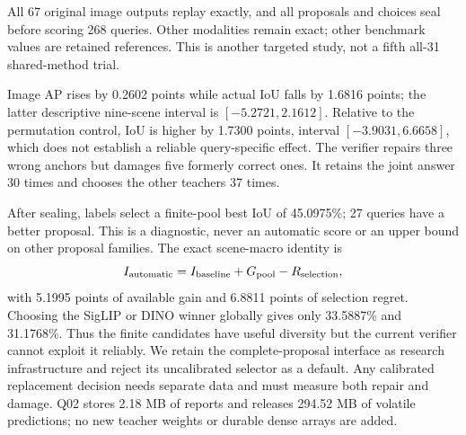 \documentclass[10pt]{article}
\begin{document}
All 67 original image outputs replay exactly, and all proposals and choices
seal before scoring 268 queries. Other modalities remain exact; other benchmark
values are retained references. This is another targeted study, not a fifth
all-31 shared-method trial.
\begin{table}[ht]
\centering\small

\caption{Q02: preserving complete proposals does not by itself guarantee a
correct identity-verification decision. Neither automatic rule is promoted.}
\end{table}

Image AP rises by 0.2602 points while actual IoU falls by 1.6816 points; the
latter descriptive nine-scene interval is $[-5.2721,2.1612]$. Relative to the
permutation control, IoU is higher by 1.7300 points, interval
$[-3.9031,6.6658]$, which does not establish a reliable query-specific effect.
The verifier repairs three wrong anchors but damages five formerly correct ones.
It retains the joint answer 30 times and chooses the other teachers 37 times.

After sealing, labels select a finite-pool best IoU of 45.0975\%; 27 queries
have a better proposal. This is a diagnostic, never an automatic score or an
upper bound on other proposal families. The exact scene-macro identity is
\begin{equation}
 I_{\rm automatic}=I_{\rm baseline}+G_{\rm pool}-R_{\rm selection},
\end{equation}
with 5.1995 points of available gain and 6.8811 points of selection regret.
Choosing the SigLIP or DINO winner globally gives only 33.5887\% and 31.1768\%.
Thus the finite candidates have useful diversity but the current verifier
cannot exploit it reliably. We retain the complete-proposal interface as
research infrastructure and reject its uncalibrated selector as a default.
Any calibrated replacement decision needs separate data and must measure both
repair and damage. Q02 stores 2.18 MB of reports and releases 294.52 MB of
volatile predictions; no new teacher weights or durable dense arrays are added.
\end{document}
